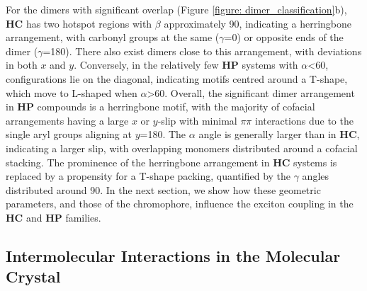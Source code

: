 For the dimers with significant overlap (Figure \ref{figure: dimer_classification}b), \textbf{HC} has two hotspot regions with $\beta$ approximately 90\degree, indicating a herringbone arrangement, with carbonyl groups at the same ($\gamma$=0\degree) or opposite ends of the dimer ($\gamma$=180\degree). There also exist dimers close to this arrangement, with deviations in both $x$ and $y$. Conversely, in the relatively few \textbf{HP} systems with  $\alpha$\textless{60}, configurations lie on the diagonal, indicating motifs centred around a T-shape, which move to L-shaped when $\alpha$\textgreater{60}. Overall, the significant dimer arrangement in \textbf{HP} compounds is a herringbone motif, with the majority of cofacial arrangements having a large $x$ or $y$-slip with minimal $\pi\pi$ interactions due to the single aryl groups aligning at $y$=180\degree. The $\alpha$ angle is generally larger than in \textbf{HC}, indicating a larger slip, with overlapping monomers distributed around a cofacial stacking. The prominence of the herringbone arrangement in \textbf{HC} systems is replaced by a propensity for a T-shape packing, quantified by the $\gamma$ angles distributed around 90\degree. In the next section, we show how these geometric parameters, and those of the chromophore, influence the exciton coupling in the \textbf{HC} and \textbf{HP} families.
\subsection{Intermolecular Interactions in the Molecular Crystal}\label{section: Connecting_Interactions}

